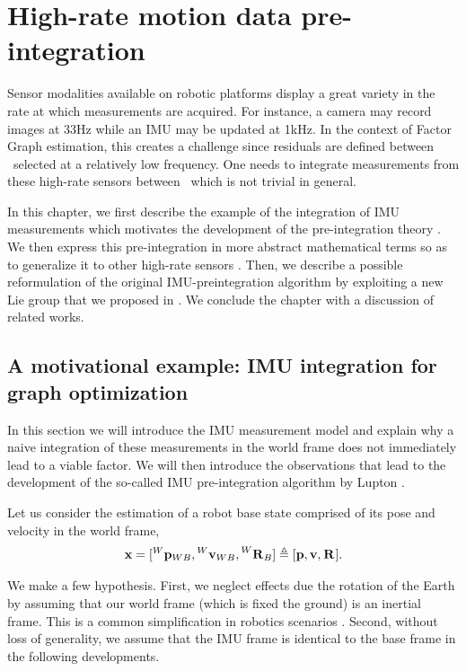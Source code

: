 \chapter{High-rate motion data pre-integration}
\label{chp:preintegration}
\minitoc
\bigskip


Sensor modalities available on robotic platforms display a great variety in the rate at which measurements are acquired. For instance, 
a camera may record images at 33Hz while an IMU may be updated at 1kHz. In the context of Factor Graph estimation, this creates a challenge since residuals
are defined between \keyframes\ selected at a relatively low frequency. One needs to integrate measurements from these high-rate sensors between \keyframes\,
which is not trivial in general.

In this chapter, we first describe the example of the integration of IMU measurements which motivates the development of the pre-integration theory \cite{lupton-09,forster2017-TRO}.
We then express this pre-integration in more abstract mathematical terms so as to generalize it to other high-rate sensors \cite{atchuthan-18-thesis}. 
Then, we describe a possible reformulation of the original IMU-preintegration algorithm \cite{forster2017-TRO} by exploiting a new Lie group that we 
proposed in \cite{fourmy2019absolute}. We conclude the chapter with a discussion of related works.

  
\section{A motivational example: IMU integration for graph optimization}
\label{sec:imu_preint_motivation}

In this section we will introduce the IMU measurement model and explain why a naive integration of these measurements in the world frame does not immediately
lead to a viable factor. We will then introduce the observations that lead to the development of the so-called IMU pre-integration algorithm by Lupton \cite{lupton-09}.

Let us consider the estimation of a robot base state comprised of its pose and velocity in the world frame,
%
\begin{equation}
    {\bf x} = [\prescript{W}{}{{\bf p}}_{WB}, \prescript{W}{}{{\bf v}}_{WB}, \prescript{W}{}{{\bf R}}_{B}]
    \triangleq 
    [{\bf p}, {\bf v}, \prescript{}{}{{\bf R}}_{}].
\end{equation}

We make a few hypothesis. First, we neglect effects due the rotation of the Earth by assuming 
that our world frame (which is fixed \wrt the ground) is an inertial frame. This is a common simplification in robotics scenarios \cite{forster2017-TRO}. 
Second, without loss of generality, we assume that the IMU frame is identical to the base frame in the following developments.

